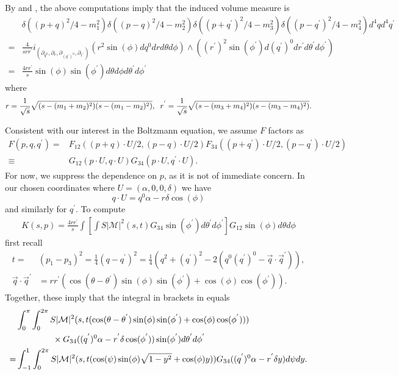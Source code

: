 By  and , the above computations imply that the induced volume measure is
\begin{align}
&\delta((p+q)^2/4-m_1^2)\delta((p-q)^2/4-m_2^2)\delta((p+q^{'})^2/4-m_3^2)\delta((p-q^{'})^2/4-m_4^2)d^4qd^4q^{'}\\
=&\frac{4}{srr^{'}}i_{(\partial_{q^0},\partial_{r},\partial _{(q^{'})^0},\partial_{r^{'}})}\left(r^2\sin(\phi)dq^0drd\theta d\phi\right)\wedge\left((r^{'})^2\sin(\phi^{'})d(q^{'})^0dr^{'}d\theta^{'}d\phi^{'}\right)\\
=&\frac{4rr^{'}}{s}\sin(\phi)\sin(\phi^{'})d\theta d\phi d\theta^{'}d\phi^{'}
\end{align}
where
\begin{equation}
r=\frac{1}{\sqrt{s}}\sqrt{(s-(m_1+m_2)^2)(s-(m_1-m_2)^2)},\hspace{2mm} r^{'}=\frac{1}{\sqrt{s}}\sqrt{(s-(m_3+m_4)^2)(s-(m_3-m_4)^2)}.
\end{equation}


Consistent with our interest in the Boltzmann equation, we assume $F$ factors as
\begin{align}
 F(p,q,q^{'})=&F_{12}((p+q)\cdot U/2,(p-q)\cdot U/2)F_{34}((p+q^{'})\cdot U/2,(p-q^{'})\cdot U/2)\\
\equiv &G_{12}(p\cdot U,q\cdot U)G_{34}(p\cdot U,q^{'}\cdot U).
\end{align}
For now, we suppress the dependence on $p$, as it is not of immediate concern. In our chosen coordinates where $U=(\alpha,0,0,\delta)$ we have
\begin{equation}
q\cdot U=q^0\alpha-r\delta\cos(\phi)
\end{equation}
and similarly for $q^{'}$.
To compute
\begin{align}\label{K_angular1}
K(s,p)=\frac{4rr^{'}}{s}\int \left[\int S |\mathcal{M}|^2 (s,t) G_{34}\sin(\phi^{'})d\theta^{'} d\phi^{'}\right] G_{12}\sin(\phi)d\theta d\phi
\end{align}
first recall 
\begin{align}
t=&(p_1-p_3)^2=\frac{1}{4}(q- q^{'})^2=\frac{1}{4}(q^2+(q^{'})^2-2(q^0(q^{'})^0-\vec{q}\cdot \vec{q}^{'})),\\
\vec{q}\cdot\vec{q}^{'}&=rr^{'}(\cos(\theta-\theta^{'})\sin(\phi)\sin(\phi^{'})+\cos(\phi)\cos(\phi^{'})).
\end{align}
Together, these imply that the integral in brackets in   equals
{\small
\begin{align}
&\int_0^\pi\int_0^{2\pi} S |\mathcal{M}|^2 (s,t(\cos(\theta-\theta^{'})\sin(\phi)\sin(\phi^{'})+\cos(\phi)\cos(\phi^{'})))\\
&\hspace{15mm}\times G_{34}((q^{'})^0\alpha-r^{'}\delta\cos(\phi^{'}))\sin(\phi^{'})d\theta^{'} d\phi^{'}\notag\\
=&\int_{-1}^1\int_0^{2\pi} S |\mathcal{M}|^2 (s,t(\cos(\psi)\sin(\phi)\sqrt{1-y^2}+\cos(\phi)y)) G_{34}((q^{'})^0\alpha-r^{'}\delta y)d\psi dy.
\end{align}
}

